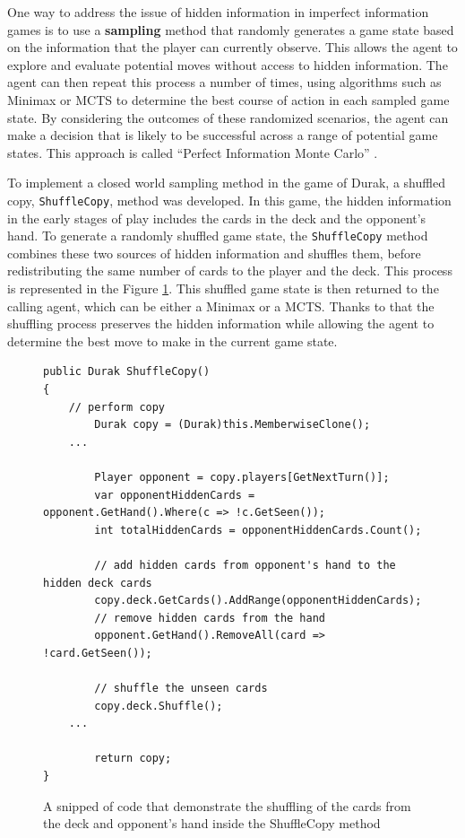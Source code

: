 One way to address the issue of hidden information in imperfect information games is to use a \textbf{sampling} method that randomly generates a game state based on the information that the player can currently observe. This allows the agent to explore and evaluate potential moves without access to hidden information. The agent can then repeat this process a number of times, using algorithms such as Minimax or MCTS to determine the best course of action in each sampled game state. By considering the outcomes of these randomized scenarios, the agent can make a decision that is likely to be successful across a range of potential game states. This approach is called  ``Perfect Information Monte Carlo'' \citep{PerfectInformationMC}.

To implement a closed world sampling method in the game of Durak, a shuffled copy, \texttt{ShuffleCopy}, method was developed. In this game, the hidden information in the early stages of play includes the cards in the deck and the opponent's hand. To generate a randomly shuffled game state, the \texttt{ShuffleCopy} method combines these two sources of hidden information and shuffles them, before redistributing the same number of cards to the player and the deck. This process is represented in the Figure \ref{fig:shuffleCopy}. This shuffled game state is then returned to the calling agent, which can be either a Minimax or a MCTS. Thanks to that the shuffling process preserves the hidden information while allowing the agent to determine the best move to make in the current game state.

\begin{figure}[h]
\captionsetup{justification=centering}
\begin{lstlisting}
public Durak ShuffleCopy()
{
	// perform copy
    	Durak copy = (Durak)this.MemberwiseClone();
	...
	
    	Player opponent = copy.players[GetNextTurn()];
    	var opponentHiddenCards = opponent.GetHand().Where(c => !c.GetSeen());
    	int totalHiddenCards = opponentHiddenCards.Count();

    	// add hidden cards from opponent's hand to the hidden deck cards
    	copy.deck.GetCards().AddRange(opponentHiddenCards);
    	// remove hidden cards from the hand
    	opponent.GetHand().RemoveAll(card => !card.GetSeen());

    	// shuffle the unseen cards 
    	copy.deck.Shuffle();
	...
	
    	return copy;
}
\end{lstlisting}
\caption{A snipped of code that demonstrate the shuffling of the cards from the deck and opponent's hand inside the ShuffleCopy method}
\label{fig:shuffleCopy}
\end{figure}


